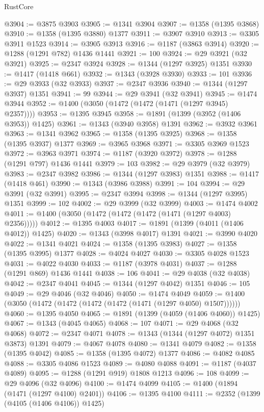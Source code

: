 \begin{lexlean}{RustCore}
\begin{coremodule}
@3904 := @3875 @3903
@3905 := @1341 @3904
@3907 := @1358 (@1395 @3868)
@3910 := @1358 (@1395 @3880) @1377
@3911 := @3907 @3910
@3913 := @3305 @3911 @1523
@3914 := @3905 @3913
@3916 := @1187 (@3863 @3914)
@3920 := @1288 (@1291 @782) @1436 @1441
@3921 := 100
@3924 := @29 @3921 (@32 @3921)
@3925 := @2347 @3924
@3928 := @1344 (@1297 @3925) @1351
@3930 := @1417 (@1418 @661)
@3932 := @1343 (@3928 @3930)
@3933 := 101
@3936 := @29 @3933 (@32 @3933)
@3937 := @2347 @3936
@3940 := @1344 (@1297 @3937) @1351
@3941 := 99
@3944 := @29 @3941 (@32 @3941)
@3945 := @1474 @3944
@3952 := @1400 (@3050 (@1472 (@1472 (@1471 (@1297 @3945) @2357))))
@3953 := @1395 @3945
@3958 := @1891 (@1399 (@3952 (@1406 @3953)) @1425)
@3961 := @1343 (@3940 @3958) @1391
@3962 := @3932 @3961
@3963 := @1341 @3962
@3965 := @1358 (@1395 @3925)
@3968 := @1358 (@1395 @3937) @1377
@3969 := @3965 @3968
@3971 := @3305 @3969 @1523
@3972 := @3963 @3971
@3974 := @1187 (@3920 @3972)
@3978 := @1288 (@1291 @797) @1436 @1441
@3979 := 103
@3982 := @29 @3979 (@32 @3979)
@3983 := @2347 @3982
@3986 := @1344 (@1297 @3983) @1351
@3988 := @1417 (@1418 @461)
@3990 := @1343 (@3986 @3988)
@3991 := 104
@3994 := @29 @3991 (@32 @3991)
@3995 := @2347 @3994
@3998 := @1344 (@1297 @3995) @1351
@3999 := 102
@4002 := @29 @3999 (@32 @3999)
@4003 := @1474 @4002
@4011 := @1400 (@3050 (@1472 (@1472 (@1472 (@1471 (@1297 @4003) @2356)))))
@4012 := @1395 @4003
@4017 := @1891 (@1399 (@4011 (@1406 @4012)) @1425)
@4020 := @1343 (@3998 @4017) @1391
@4021 := @3990 @4020
@4022 := @1341 @4021
@4024 := @1358 (@1395 @3983)
@4027 := @1358 (@1395 @3995) @1377
@4028 := @4024 @4027
@4030 := @3305 @4028 @1523
@4031 := @4022 @4030
@4033 := @1187 (@3978 @4031)
@4037 := @1288 (@1291 @869) @1436 @1441
@4038 := 106
@4041 := @29 @4038 (@32 @4038)
@4042 := @2347 @4041
@4045 := @1344 (@1297 @4042) @1351
@4046 := 105
@4049 := @29 @4046 (@32 @4046)
@4050 := @1474 @4049
@4059 := @1400 (@3050 (@1472 (@1472 (@1472 (@1472 (@1471 (@1297 @4050) @1507))))))
@4060 := @1395 @4050
@4065 := @1891 (@1399 (@4059 (@1406 @4060)) @1425)
@4067 := @1343 (@4045 @4065)
@4068 := 107
@4071 := @29 @4068 (@32 @4068)
@4072 := @2347 @4071
@4078 := @1343 (@1344 (@1297 @4072) @1351 @3873) @1391
@4079 := @4067 @4078
@4080 := @1341 @4079
@4082 := @1358 (@1395 @4042)
@4085 := @1358 (@1395 @4072) @1377
@4086 := @4082 @4085
@4088 := @3305 @4086 @1523
@4089 := @4080 @4088
@4091 := @1187 (@4037 @4089)
@4095 := @1288 (@1291 @919) @1808 @1213
@4096 := 108
@4099 := @29 @4096 (@32 @4096)
@4100 := @1474 @4099
@4105 := @1400 (@1894 (@1471 (@1297 @4100) @2401))
@4106 := @1395 @4100
@4111 := @2352 (@1399 (@4105 (@1406 @4106)) @1425)

\end{coremodule}
\end{lexlean}
